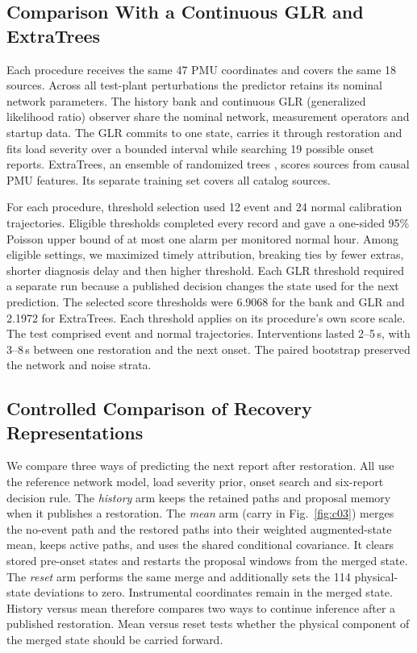 \subsection{Comparison With a Continuous GLR and ExtraTrees}
\label{sec:comparison-design}
Each procedure receives the same 47 PMU coordinates and covers the same
18 sources. Across all test-plant perturbations the predictor retains its nominal
network parameters. The history bank and continuous GLR (generalized likelihood
ratio) observer share the nominal network, measurement operators and
startup data. The GLR commits to one state, carries it through
restoration and fits load severity over a bounded interval while searching
19 possible onset reports. ExtraTrees, an ensemble of randomized trees
\cite{geurts2006extremely}, scores sources from causal PMU features. Its
separate training set covers all catalog sources.

For each procedure, threshold selection used 12 event and 24 normal
calibration trajectories. Eligible thresholds completed every record
and gave a one-sided 95\% Poisson upper bound of at most one alarm per
monitored normal hour. Among eligible settings, we maximized timely
attribution, breaking ties by fewer extras, shorter diagnosis delay and
then higher threshold. Each GLR threshold required a separate run because
a published decision changes the state used for the next prediction.
The selected score thresholds were 6.9068 for the bank and GLR and 2.1972
for ExtraTrees. Each threshold applies on its procedure's own score scale.
The test comprised \RecParents{} event and \RecNormalParents{} normal
trajectories. Interventions lasted 2--5\,s, with 3--8\,s between one
restoration and the next onset. The paired bootstrap preserved the network
and noise strata.

\subsection{Controlled Comparison of Recovery Representations}
We compare three ways of predicting the next report after restoration.
All use the reference network model, load severity prior, onset search and
six-report decision rule. The \emph{history} arm keeps the
retained paths and proposal memory when it publishes a restoration.
The \emph{mean} arm (carry in Fig.~\ref{fig:c03}) merges the no-event
path and the restored paths into their weighted augmented-state mean,
keeps active paths, and uses the shared conditional covariance. It clears
stored pre-onset states and restarts the proposal windows from the
merged state. The \emph{reset} arm performs the same merge and
additionally sets the 114 physical-state deviations to zero.
Instrumental coordinates remain in the merged state. History versus mean
therefore compares two ways to continue inference after a published
restoration. Mean versus reset tests whether the physical component
of the merged state should be carried forward.

